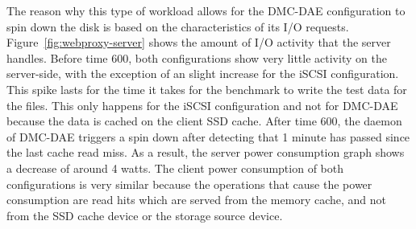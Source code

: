 The reason why this type of workload allows for the DMC-DAE configuration to
spin down the disk is based on the characteristics of its I/O
requests. Figure~\ref{fig:webproxy-server} shows the amount of I/O activity that
the server handles.  Before time 600, both configurations show very little
activity on the server-side, with the exception of an slight increase for the
iSCSI configuration.  This spike lasts for the time it takes for the benchmark
to write the test data for the files. This only happens for the iSCSI
configuration and not for DMC-DAE because the data is cached on the client SSD
cache. After time 600, the daemon of DMC-DAE triggers a spin down after
detecting that 1 minute has passed since the last cache read miss. As a result,
the server power consumption graph shows a decrease of around 4 watts. The
client power consumption of both configurations is very similar because the
operations that cause the power consumption are read hits which are served from
the memory cache, and not from the SSD cache device or the storage source
device.

